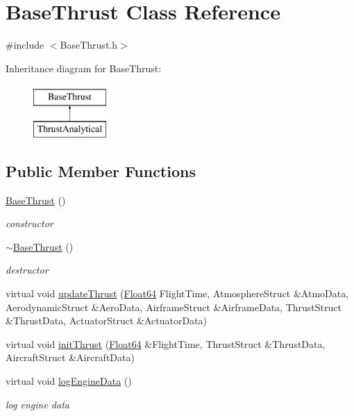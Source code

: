 \hypertarget{class_base_thrust}{}\section{Base\+Thrust Class Reference}
\label{class_base_thrust}


{\ttfamily \#include $<$Base\+Thrust.\+h$>$}

Inheritance diagram for Base\+Thrust\+:\begin{figure}[H]
\begin{center}
\leavevmode
\includegraphics[height=2.000000cm]{class_base_thrust}
\end{center}
\end{figure}
\subsection*{Public Member Functions}
\begin{DoxyCompactItemize}
\item 
\hyperlink{class_base_thrust_a19885a6a70bfc4c02e2d8f310af9f22e}{Base\+Thrust} ()
\begin{DoxyCompactList}\small\item\em constructor \end{DoxyCompactList}\item 
\hyperlink{class_base_thrust_a554955351c2acfe7a46c00fe056c5c6c}{$\sim$\+Base\+Thrust} ()
\begin{DoxyCompactList}\small\item\em destructor \end{DoxyCompactList}\item 
virtual void \hyperlink{class_base_thrust_a48a3d47f4b4b40f53f7f86ebf58e4c06}{update\+Thrust} (\hyperlink{group___tools_ga3f1431cb9f76da10f59246d1d743dc2c}{Float64} Flight\+Time, Atmosphere\+Struct \&Atmo\+Data, Aerodynamic\+Struct \&Aero\+Data, Airframe\+Struct \&Airframe\+Data, Thrust\+Struct \&Thrust\+Data, Actuator\+Struct \&Actuator\+Data)
\item 
virtual void \hyperlink{class_base_thrust_a59c4c4eb224cd983c39c8ddc404ad2d6}{init\+Thrust} (\hyperlink{group___tools_ga3f1431cb9f76da10f59246d1d743dc2c}{Float64} \&Flight\+Time, Thrust\+Struct \&Thrust\+Data, Aircraft\+Struct \&Aircraft\+Data)
\item 
virtual void \hyperlink{class_base_thrust_af13088a23a8c57cedede6930ee61d52e}{log\+Engine\+Data} ()
\begin{DoxyCompactList}\small\item\em log engine data \end{DoxyCompactList}\end{DoxyCompactItemize}


